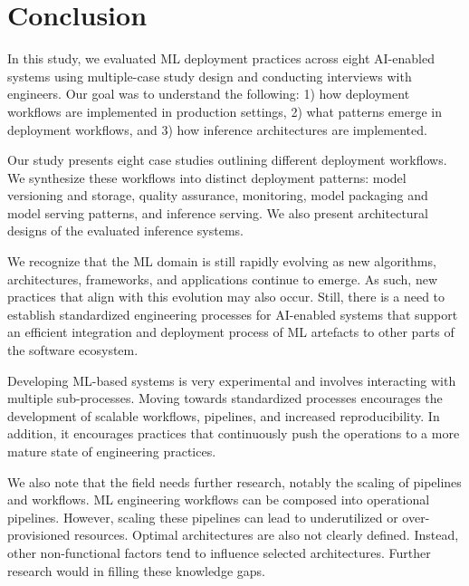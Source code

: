 \section{Conclusion}
\label{sec: conclusion}

In this study, we evaluated ML deployment practices across eight AI-enabled systems using multiple-case study design and conducting interviews with engineers. Our goal was to understand the following: 1) how deployment workflows are implemented in production settings, 2) what patterns emerge in deployment workflows, and 3) how inference architectures are implemented.

Our study presents eight case studies outlining different deployment workflows. We synthesize these workflows into distinct deployment patterns: model versioning and storage, quality assurance, monitoring, model packaging and model serving patterns, and inference serving. We also present architectural designs of the evaluated inference systems.

We recognize that the ML domain is still rapidly evolving as new algorithms, architectures, frameworks, and applications continue to emerge. As such, new practices that align with this evolution may also occur. Still, there is a need to establish standardized engineering processes for AI-enabled systems that support an efficient integration and deployment process of ML artefacts to other parts of the software ecosystem.

Developing ML-based systems is very experimental and involves interacting with multiple sub-processes. Moving towards standardized processes encourages the development of scalable workflows, pipelines, and increased reproducibility. In addition, it encourages practices that continuously push the operations to a  more mature state of engineering practices.

We also note that the field needs further research, notably the scaling of pipelines and workflows. ML engineering workflows can be composed into operational pipelines. However, scaling these pipelines can lead to underutilized or over-provisioned resources. Optimal architectures are also not clearly defined. Instead, other non-functional factors tend to influence selected architectures. Further research would in filling these knowledge gaps.